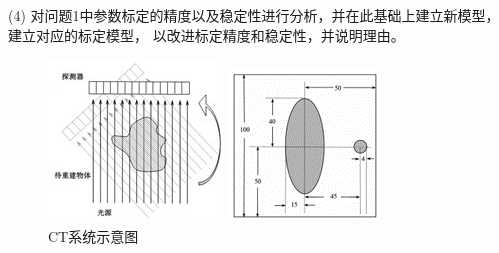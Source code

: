 \documentclass[12pt]{ctexart}
\begin{document}
	\noindent
	(4) 对问题1中参数标定的精度以及稳定性进行分析，并在此基础上建立新模型，建立对应的标定模型，
	以改进标定精度和稳定性，并说明理由。
	
	\begin{figure}[htbp]
		\centering
		\begin{minipage}[t]{0.32\textwidth}
			\centering
			\includegraphics[width=\textwidth]{CT系统示意图.jpg}
			\caption{CT系统示意图}
		\end{minipage}
		\begin{minipage}[t]{0.32\textwidth}
			\centering
			\includegraphics[width=\textwidth]{模板示意图.png}

\end{minipage}
\end{figure}
\end{document}
